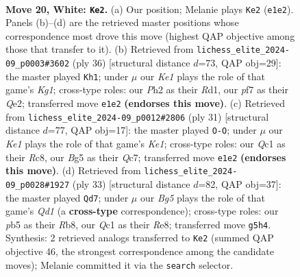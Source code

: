 \documentclass[11pt]{article}
\begin{document}
\begin{figure}[p]
\label{fig:thought-m36}
\end{figure}

\clearpage

\begin{figure}[p]\centering
\begin{subfigure}{0.46\textwidth}\centering
\resizebox{\linewidth}{!}{%
\newchessgame
\chessboard[
  setfen={r1r3k1/1bqn1p1p/5bp1/pppPp1B1/4P3/1BP3PN/P4P1P/R1Q1K2R w - - 4 20},
  showmover=false,
  pgfstyle=straightmove, color=movearrow, markmove={e1-e2}
]}
\caption{}
\end{subfigure}\hfill
\begin{subfigure}{0.46\textwidth}\centering
\resizebox{\linewidth}{!}{%
\newchessgame
\chessboard[
  setfen={1r3rk1/p2qbpp1/2p1b2p/2P1p2n/NPBpP3/5P2/P2BQ1PP/R2R2K1 w - - 0 19},
  showmover=false,
  pgfstyle=straightmove, color=movearrow, markmove={g1-h1}
]}
\caption{}
\end{subfigure}
\\[4pt]
\begin{subfigure}{0.46\textwidth}\centering
\resizebox{\linewidth}{!}{%
\newchessgame
\chessboard[
  setfen={2r1k2r/1pqnbpp1/p2p2b1/N2Pp2p/1PP5/4BP2/P2QB1PP/R4RK1 b k - 0 16},
  showmover=false,
  pgfstyle=straightmove, color=movearrow, markmove={e8-g8}
]}
\caption{}
\end{subfigure}\hfill
\begin{subfigure}{0.46\textwidth}\centering
\resizebox{\linewidth}{!}{%
\newchessgame
\chessboard[
  setfen={1r1qr1k1/1p3p1p/p2p2p1/2pPbbBn/P7/2N3P1/1P1QPPBP/R4RK1 b - - 3 17},
  showmover=false,
  pgfstyle=straightmove, color=movearrow, markmove={d8-d7}
]}
\caption{}
\end{subfigure}
\caption{\textbf{Move 20, White: \texttt{Ke2}.} (a) Our position; Melanie plays \texttt{Ke2} (\texttt{e1e2}). Panels (b)--(d) are the retrieved master positions whose correspondence most drove this move (highest QAP objective among those that transfer to it). (b) Retrieved from \texttt{lichess\_elite\_2024-09\_p0003\#3602} (ply 36) [structural distance $d$=73, QAP obj=29]: the master played \texttt{Kh1}; under $\mu$ our \emph{Ke1} plays the role of that game's \emph{Kg1}; cross-type roles: our \emph{P}h2 as their \emph{R}d1, our \emph{p}f7 as their \emph{Q}e2; transferred move \texttt{e1e2} \textbf{(endorses this move)}. (c) Retrieved from \texttt{lichess\_elite\_2024-09\_p0012\#2806} (ply 31) [structural distance $d$=77, QAP obj=17]: the master played \texttt{O-O}; under $\mu$ our \emph{Ke1} plays the role of that game's \emph{Ke1}; cross-type roles: our \emph{Q}c1 as their \emph{R}c8, our \emph{B}g5 as their \emph{Q}c7; transferred move \texttt{e1e2} \textbf{(endorses this move)}. (d) Retrieved from \texttt{lichess\_elite\_2024-09\_p0028\#1927} (ply 33) [structural distance $d$=82, QAP obj=37]: the master played \texttt{Qd7}; under $\mu$ our \emph{Bg5} plays the role of that game's \emph{Qd1} (a \textbf{cross-type} correspondence); cross-type roles: our \emph{p}b5 as their \emph{R}b8, our \emph{Q}c1 as their \emph{R}e8; transferred move \texttt{g5h4}. Synthesis: 2 retrieved analogs transferred to \texttt{Ke2} (summed QAP objective 46, the strongest correspondence among the candidate moves); Melanie committed it via the \texttt{search} selector.}

\end{figure}
\end{document}
